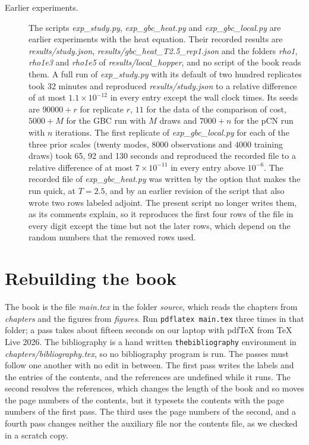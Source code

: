 \begin{description}
\item[Earlier experiments.] The scripts \textit{exp\_study.py}, \textit{exp\_gbc\_heat.py} and \textit{exp\_gbc\_local.py} are earlier experiments with the heat equation. Their recorded results are \textit{results/study.json}, \textit{results/gbc\_heat\_T2.5\_rep1.json} and the folders \textit{rho1}, \textit{rho1e3} and \textit{rho1e5} of \textit{results/local\_hopper}, and no script of the book reads them. A full run of \textit{exp\_study.py} with its default of two hundred replicates took 32 minutes and reproduced \textit{results/study.json} to a relative difference of at most $1.1\times10^{-12}$ in every entry except the wall clock times. Its seeds are $90000+r$ for replicate $r$, $11$ for the data of the comparison of cost, $5000+M$ for the GBC run with $M$ draws and $7000+n$ for the pCN run with $n$ iterations. The first replicate of \textit{exp\_gbc\_local.py} for each of the three prior scales (twenty modes, $8000$ observations and $4000$ training draws) took 65, 92 and 130 seconds and reproduced the recorded file to a relative difference of at most $7\times10^{-11}$ in every entry above $10^{-6}$. The recorded file of \textit{exp\_gbc\_heat.py} was written by the option that makes the run quick, at $T=2.5$, and by an earlier revision of the script that also wrote two rows labeled adjoint. The present script no longer writes them, as its comments explain, so it reproduces the first four rows of the file in every digit except the time but not the later rows, which depend on the random numbers that the removed rows used.
\end{description}

\section{Rebuilding the book}
\label{sec:code_rebuild}

The book is the file \textit{main.tex} in the folder \textit{source}, which reads the chapters from \textit{chapters} and the figures from \textit{figures}. Run \texttt{pdflatex main.tex} three times in that folder; a pass takes about fifteen seconds on our laptop with pdfTeX from TeX Live 2026. The bibliography is a hand written \texttt{thebibliography} environment in \textit{chapters/bibliography.tex}, so no bibliography program is run. The passes must follow one another with no edit in between. The first pass writes the labels and the entries of the contents, and the references are undefined while it runs. The second resolves the references, which changes the length of the book and so moves the page numbers of the contents, but it typesets the contents with the page numbers of the first pass. The third uses the page numbers of the second, and a fourth pass changes neither the auxiliary file nor the contents file, as we checked in a scratch copy.

